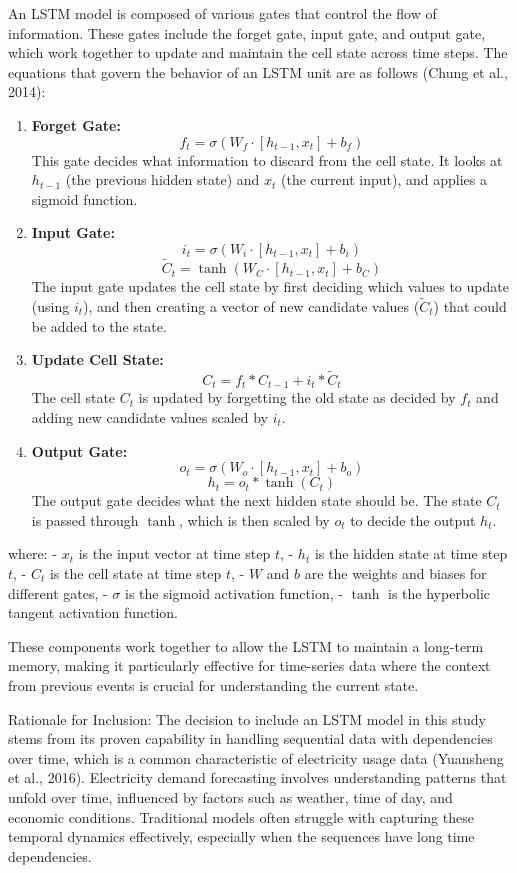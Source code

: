 \documentclass[mstat,12pt]{unswthesis}
\begin{document}
An LSTM model is composed of various gates that control the flow of
information. These gates include the forget gate, input gate, and output
gate, which work together to update and maintain the cell state across
time steps. The equations that govern the behavior of an LSTM unit are
as follows (Chung et al., 2014):

\begin{enumerate}
\def\labelenumi{\arabic{enumi}.}
\item
  \textbf{Forget Gate:}
  \[ f_t = \sigma(W_f \cdot [h_{t-1}, x_t] + b_f) \] This gate decides
  what information to discard from the cell state. It looks at
  \(h_{t-1}\) (the previous hidden state) and \(x_t\) (the current
  input), and applies a sigmoid function.
\item
  \textbf{Input Gate:}
  \[ i_t = \sigma(W_i \cdot [h_{t-1}, x_t] + b_i) \]
  \[ \tilde{C}_t = \tanh(W_C \cdot [h_{t-1}, x_t] + b_C) \] The input
  gate updates the cell state by first deciding which values to update
  (using \(i_t\)), and then creating a vector of new candidate values
  (\(\tilde{C}_t\)) that could be added to the state.
\item
  \textbf{Update Cell State:}
  \[ C_t = f_t * C_{t-1} + i_t * \tilde{C}_t \] The cell state \(C_t\)
  is updated by forgetting the old state as decided by \(f_t\) and
  adding new candidate values scaled by \(i_t\).
\item
  \textbf{Output Gate:}
  \[ o_t = \sigma(W_o \cdot [h_{t-1}, x_t] + b_o) \]
  \[ h_t = o_t * \tanh(C_t) \] The output gate decides what the next
  hidden state should be. The state \(C_t\) is passed through \(\tanh\),
  which is then scaled by \(o_t\) to decide the output \(h_t\).
\end{enumerate}

where: - \(x_t\) is the input vector at time step \(t\), - \(h_t\) is
the hidden state at time step \(t\), - \(C_t\) is the cell state at time
step \(t\), - \(W\) and \(b\) are the weights and biases for different
gates, - \(\sigma\) is the sigmoid activation function, - \(\tanh\) is
the hyperbolic tangent activation function.

These components work together to allow the LSTM to maintain a long-term
memory, making it particularly effective for time-series data where the
context from previous events is crucial for understanding the current
state.

Rationale for Inclusion: The decision to include an LSTM model in this
study stems from its proven capability in handling sequential data with
dependencies over time, which is a common characteristic of electricity
usage data (Yuansheng et al., 2016). Electricity demand forecasting
involves understanding patterns that unfold over time, influenced by
factors such as weather, time of day, and economic conditions.
Traditional models often struggle with capturing these temporal dynamics
effectively, especially when the sequences have long time dependencies.
\end{document}
